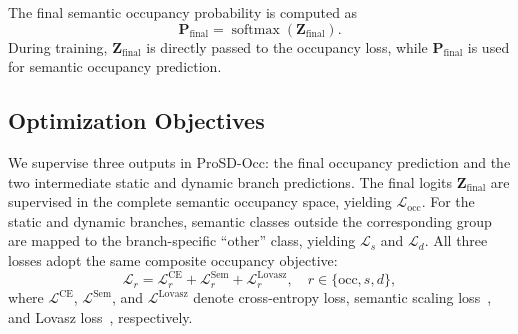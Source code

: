 The final semantic occupancy probability is computed as
\begin{equation}
  \bm{P}_{\mathrm{final}}
  =
  \operatorname{softmax}(\bm{Z}_{\mathrm{final}}).
\end{equation}
During training, $\bm{Z}_{\mathrm{final}}$ is directly passed to the occupancy
loss, while $\bm{P}_{\mathrm{final}}$ is used for semantic occupancy prediction.



\subsection{Optimization Objectives}
\label{sec:prosd_objective}

We supervise three outputs in ProSD-Occ: the final occupancy prediction and the
two intermediate static and dynamic branch predictions. The final logits
$\bm{Z}_{\mathrm{final}}$ are supervised in the complete semantic occupancy
space, yielding $\mathcal{L}_{\mathrm{occ}}$. For the static and dynamic
branches, semantic classes outside the corresponding group are mapped to the
branch-specific ``other'' class, yielding $\mathcal{L}_{s}$ and
$\mathcal{L}_{d}$. All three losses adopt the same composite occupancy
objective:
\begin{equation}
  \mathcal{L}_{r}
  =
  \mathcal{L}_{r}^{\mathrm{CE}}
  +
  \mathcal{L}_{r}^{\mathrm{Sem}}
  +
  \mathcal{L}_{r}^{\mathrm{Lovasz}},
  \quad r\in\{\mathrm{occ},s,d\},
\end{equation}
where $\mathcal{L}^{\mathrm{CE}}$, $\mathcal{L}^{\mathrm{Sem}}$, and
$\mathcal{L}^{\mathrm{Lovasz}}$ denote cross-entropy loss, semantic scaling
loss~\cite{MonoScene}, and Lovasz loss~\cite{Berman_2018_CVPR}, respectively.


